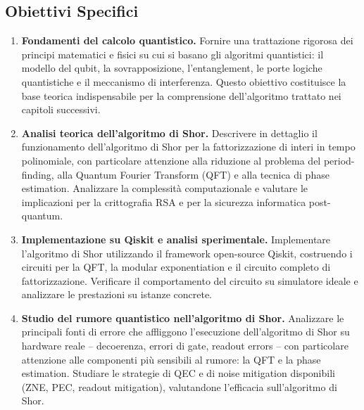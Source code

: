 \begin{onehalfspace}
\section{Obiettivi Specifici}

\begin{enumerate}

    \item \textbf{Fondamenti del calcolo quantistico.}
    Fornire una trattazione rigorosa dei principi matematici e fisici su cui si basano gli algoritmi quantistici: il modello del qubit, la sovrapposizione, l'entanglement, le porte logiche quantistiche e il meccanismo di interferenza. Questo obiettivo costituisce la base teorica indispensabile per la comprensione dell'algoritmo trattato nei capitoli successivi.

    \item \textbf{Analisi teorica dell'algoritmo di Shor.}
    Descrivere in dettaglio il funzionamento dell'algoritmo di Shor per la fattorizzazione di interi in tempo polinomiale, con particolare attenzione alla riduzione al problema del period-finding, alla Quantum Fourier Transform (\ac{QFT}) e alla tecnica di phase estimation. Analizzare la complessità computazionale e valutare le implicazioni per la crittografia \ac{RSA} e per la sicurezza informatica post-quantum.

    \item \textbf{Implementazione su Qiskit e analisi sperimentale.}
    Implementare l'algoritmo di Shor utilizzando il framework open-source Qiskit, costruendo i circuiti per la QFT, la modular exponentiation e il circuito completo di fattorizzazione. Verificare il comportamento del circuito su simulatore ideale e analizzare le prestazioni su istanze concrete.

    \item \textbf{Studio del rumore quantistico nell'algoritmo di Shor.}
    Analizzare le principali fonti di errore che affliggono l'esecuzione dell'algoritmo di Shor su hardware reale -- decoerenza, errori di gate, readout errors -- con particolare attenzione alle componenti più sensibili al rumore: la QFT e la phase estimation. Studiare le strategie di \ac{QEC} e di noise mitigation disponibili (\ac{ZNE}, \ac{PEC}, readout mitigation), valutandone l'efficacia sull'algoritmo di Shor.


\end{enumerate}
\end{onehalfspace}

